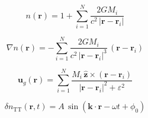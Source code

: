 \documentclass{article}
\begin{document}
\[
n(\mathbf{r}) = 1 + \sum_{i=1}^N \dfrac{2 G M_i}{c^2 \, |\mathbf{r} - \mathbf{r}_i|}
\]

\[
\nabla n(\mathbf{r}) = - \sum_{i=1}^N \dfrac{2 G M_i}{c^2 \, |\mathbf{r} - \mathbf{r}_i|^3} \, (\mathbf{r} - \mathbf{r}_i)
\]

\[
\mathbf{u}_g(\mathbf{r}) = \sum_{i=1}^N \dfrac{M_i \, \hat{\mathbf{z}} \times (\mathbf{r} - \mathbf{r}_i)}{|\mathbf{r} - \mathbf{r}_i|^2 + \varepsilon^2}
\]

\[
\delta n_{\mathrm{TT}}(\mathbf{r}, t) = A \, \sin(\mathbf{k} \cdot \mathbf{r} - \omega t + \phi_0)
\]
\end{document}
